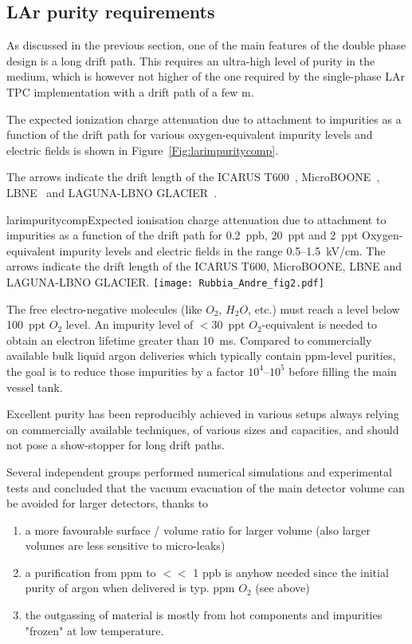 \subsection{LAr purity requirements}

As discussed in the previous section, one of the main features of the double phase design is a long drift path. This requires an ultra-high level of purity in the medium, which is however not higher of the one required by the single-phase LAr TPC implementation with a drift path of a few m. 

The expected ionization charge attenuation due to attachment to impurities as a function of the drift path for various oxygen-equivalent impurity levels and electric fields is shown in Figure~\ref{Fig:larimpuritycomp}.

The arrows indicate the drift length of the ICARUS T600~\cite{Amerio:2004ze},  MicroBOONE~\cite{Chen:2007ae}, LBNE~\cite{Akiri:2011dv} 
and LAGUNA-LBNO GLACIER~\cite{Rubbia:2009md,Rubbia:2010zz}.


\begin{cdrfigure}{larimpuritycomp}{Expected ionisation charge attenuation due to attachment to impurities as a function of the drift path for 0.2~ppb, 20~ppt and  2~ppt Oxygen-equivalent impurity levels and electric fields in the range 0.5--1.5~kV/cm. The arrows indicate the drift length of the ICARUS T600, MicroBOONE, LBNE and LAGUNA-LBNO GLACIER.}
\texttt{[image: Rubbia\_Andre\_fig2.pdf]}
\end{cdrfigure}

The  free electro-negative molecules (like $O_2$, $H_2O$, etc.) must reach a level below 100~ppt $O_2$ level. An impurity level 
of $<30$~ppt $O_2$-equivalent is needed to obtain an electron lifetime greater than 10~ms. Compared to commercially available bulk liquid argon deliveries which typically contain ppm-level purities, the goal is to reduce those impurities by a factor $10^4$--$10^5$ before filling the main vessel tank. 

Excellent purity has been reproducibly achieved in various setups always relying on commercially available techniques, of various sizes and capacities, and should not pose a  show-stopper for long drift paths.

Several independent groups performed numerical simulations and experimental tests and  concluded that the vacuum evacuation of the main detector volume can be avoided for larger detectors, thanks to 
\begin{enumerate}
\item{ a more favourable surface / volume ratio for larger volume 
(also larger volumes are less sensitive to micro-leaks)}
\item{ a purification from ppm to $<<$ 1 ppb is anyhow needed
since the initial purity of argon when delivered is typ. ppm $O_2$ (see above)}
\item{  the outgassing of material is mostly from hot components
and impurities "frozen" at low temperature.}
\end{enumerate}

